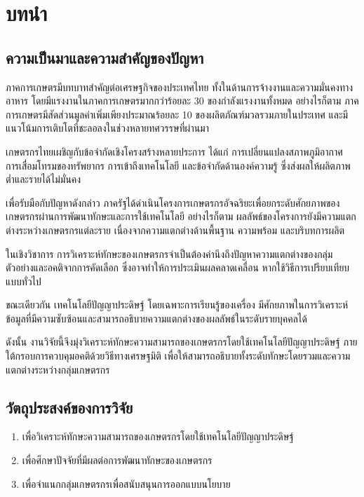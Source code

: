 \chapter{บทนำ}

\section{ความเป็นมาและความสำคัญของปัญหา}

ภาคการเกษตรมีบทบาทสำคัญต่อเศรษฐกิจของประเทศไทย ทั้งในด้านการจ้างงานและความมั่นคงทางอาหาร โดยมีแรงงานในภาคการเกษตรมากกว่าร้อยละ 30 ของกำลังแรงงานทั้งหมด อย่างไรก็ตาม ภาคการเกษตรมีสัดส่วนมูลค่าเพิ่มเพียงประมาณร้อยละ 10 ของผลิตภัณฑ์มวลรวมภายในประเทศ และมีแนวโน้มการเติบโตที่ชะลอลงในช่วงหลายทศวรรษที่ผ่านมา \cite{un2020}

เกษตรกรไทยเผชิญกับข้อจำกัดเชิงโครงสร้างหลายประการ ได้แก่ การเปลี่ยนแปลงสภาพภูมิอากาศ การเสื่อมโทรมของทรัพยากร การเข้าถึงเทคโนโลยี และข้อจำกัดด้านองค์ความรู้ ซึ่งส่งผลให้ผลิตภาพต่ำและรายได้ไม่มั่นคง \cite{chadarat2562, rueatee2557}

เพื่อรับมือกับปัญหาดังกล่าว ภาครัฐได้ดำเนินโครงการเกษตรกรอัจฉริยะเพื่อยกระดับศักยภาพของเกษตรกรผ่านการพัฒนาทักษะและการใช้เทคโนโลยี \cite{jansuwan2021} อย่างไรก็ตาม ผลลัพธ์ของโครงการยังมีความแตกต่างระหว่างเกษตรกรแต่ละราย เนื่องจากความแตกต่างด้านพื้นฐาน ความพร้อม และบริบทการผลิต

ในเชิงวิชาการ การวิเคราะห์ทักษะของเกษตรกรจำเป็นต้องคำนึงถึงปัญหาความแตกต่างของกลุ่มตัวอย่างและอคติจากการคัดเลือก \cite{rosenbaum1983} ซึ่งอาจทำให้การประเมินผลคลาดเคลื่อน หากใช้วิธีการเปรียบเทียบแบบทั่วไป

ขณะเดียวกัน เทคโนโลยีปัญญาประดิษฐ์ โดยเฉพาะการเรียนรู้ของเครื่อง มีศักยภาพในการวิเคราะห์ข้อมูลที่มีความซับซ้อนและสามารถอธิบายความแตกต่างของผลลัพธ์ในระดับรายบุคคลได้ \cite{aggarwal2018}

ดังนั้น งานวิจัยนี้จึงมุ่งวิเคราะห์ทักษะความสามารถของเกษตรกรโดยใช้เทคโนโลยีปัญญาประดิษฐ์ ภายใต้กรอบการควบคุมอคติด้วยวิธีทางเศรษฐมิติ เพื่อให้สามารถอธิบายทั้งระดับทักษะโดยรวมและความแตกต่างระหว่างกลุ่มเกษตรกร

\section{วัตถุประสงค์ของการวิจัย}

\begin{enumerate}
\item เพื่อวิเคราะห์ทักษะความสามารถของเกษตรกรโดยใช้เทคโนโลยีปัญญาประดิษฐ์  
\item เพื่อศึกษาปัจจัยที่มีผลต่อการพัฒนาทักษะของเกษตรกร  
\item เพื่อจำแนกกลุ่มเกษตรกรเพื่อสนับสนุนการออกแบบนโยบาย  
\end{enumerate}

